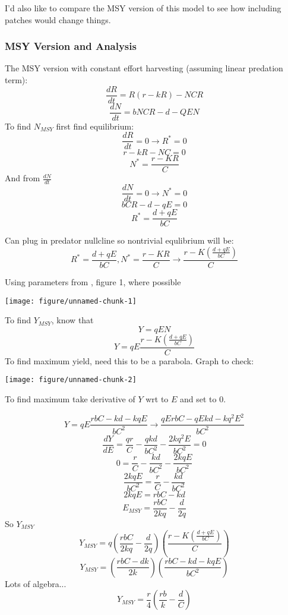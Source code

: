 \documentclass{article}\usepackage{graphicx, color}
\makeatletter
\def\maxwidth{ %
  \ifdim\Gin@nat@width>\linewidth
    \linewidth
  \else
    \Gin@nat@width
  \fi
}
\newenvironment{knitrout}{}{} %
\makeatother
\begin{document}
I'd also like to compare the MSY version of this model to see how including patches would change things. 

\subsubsection{MSY Version and Analysis}
The MSY version with constant effort harvesting (assuming linear predation term):
\[\frac{dR}{dt}=R(r-kR)-NCR\]
\[\frac{dN}{dt}=bNCR-d-QEN\]
To find $N_{MSY}$ first find equilibrium:
\[\frac{dR}{dt}=0\rightarrow R^*=0\]
\[r -kR-NC=0\]
\[N^* = \frac{r-KR}{C}\]
And from $\frac{dN}{dt}$
\[\frac{dN}{dt}=0\rightarrow N^*=0\]
\[bCR-d-qE=0\]
\[R^*=\frac{d+qE}{bC}\]

Can plug in predator nullcline so nontrivial equlibrium will be:
\[R^*=\frac{d+qE}{bC},N^*=\frac{r-KR}{C}\rightarrow\frac{r-K\left(\frac{d+qE}{bC}\right)}{C}\]

Using parameters from \cite{abramsetal:2012}, figure 1, where possible

\begin{knitrout}
\color{fgcolor}
\texttt{[image: figure/unnamed-chunk-1]} 

\end{knitrout}


To find $Y_{MSY}$, know that 
\[Y=qEN\]
\[Y=qE\frac{r-K\left(\frac{d+qE}{bC}\right)}{C}\]
To find maximum yield, need this to be a parabola. Graph to check:

\begin{knitrout}
\color{fgcolor}
\texttt{[image: figure/unnamed-chunk-2]} 

\end{knitrout}


To find maximum take derivative of $Y$ wrt to $E$ and set to 0. 

\[Y = qE\frac{rbC-kd-kqE}{bC^2}\rightarrow \frac{qErbC-qEkd-kq^2E^2}{bC^2}\]
\[\frac{dY}{dE}=\frac{qr}{C}-\frac{qkd}{bC^2}-\frac{2kq^2E}{bC^2}=0\]
\[0 = \frac{r}{C}-\frac{kd}{bC^2}-\frac{2kqE}{bC^2}\]
\[\frac{2kqE}{bC^2} = \frac{r}{C}-\frac{kd}{bC^2}\]
\[2kqE=rbC-kd\]
\[E_{MSY}=\frac{rbC}{2kq}-\frac{d}{2q}\]
So $Y_{MSY}$ 
\[Y_{MSY}=q\left(\frac{rbC}{2kq}-\frac{d}{2q}\right)\left(\frac{r-K\left(\frac{d+qE}{bC}\right)}{C}\right)\]
\[Y_{MSY}=\left(\frac{rbC-dk}{2k}\right)\left(\frac{rbC-kd-kqE}{bC^2}\right)\]
Lots of algebra...
\[Y_{MSY}=\frac{r}{4}\left(\frac{rb}{k}-\frac{d}{C}\right)\]
\end{document}
